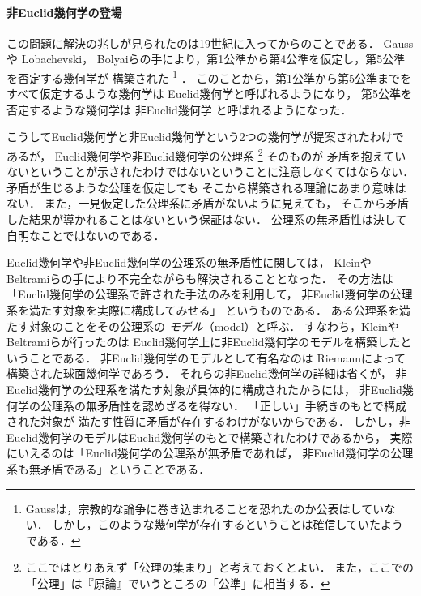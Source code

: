  \paragraph{非Euclid幾何学の登場}
  この問題に解決の兆しが見られたのは19世紀に入ってからのことである．
  Gaussや
  Lobachevski，
  Bolyaiらの手により，第1公準から第4公準を仮定し，第5公準を否定する幾何学が
  構築された
  \footnote{Gaussは，宗教的な論争に巻き込まれることを恐れたのか公表はしていない．
  しかし，このような幾何学が存在するということは確信していたようである．}
  ．
  このことから，第1公準から第5公準までを
  すべて仮定するような幾何学は
  Euclid幾何学と呼ばれるようになり，
  第5公準を否定するような幾何学は
  非Euclid幾何学
  と呼ばれるようになった．

  こうしてEuclid幾何学と非Euclid幾何学という2つの幾何学が提案されたわけであるが，
  Euclid幾何学や非Euclid幾何学の公理系
  \footnote{ここではとりあえず「公理の集まり」と考えておくとよい．
  また，ここでの「公理」は『原論』でいうところの「公準」に相当する．}
  そのものが
  矛盾を抱えていないということが示されたわけではないということに注意しなくてはならない．
  矛盾が生じるような公理を仮定しても
  そこから構築される理論にあまり意味はない．
  また，一見仮定した公理系に矛盾がないように見えても，
  そこから矛盾した結果が導かれることはないという保証はない．
  公理系の無矛盾性は決して自明なことではないのである．

  Euclid幾何学や非Euclid幾何学の公理系の無矛盾性に関しては，
  Kleinや
  Beltramiらの手により不完全ながらも解決されることとなった．
  その方法は「Euclid幾何学の公理系で許された手法のみを利用して，
  非Euclid幾何学の公理系を満たす対象を実際に構成してみせる」
  というものである．
  ある公理系を満たす対象のことをその公理系の
  \emph{モデル}（model）と呼ぶ．
  すなわち，KleinやBeltramiらが行ったのは
  Euclid幾何学上に非Euclid幾何学のモデルを構築したということである．
  非Euclid幾何学のモデルとして有名なのは
  Riemannによって構築された球面幾何学であろう．
  それらの非Euclid幾何学の詳細は省くが，
  非Euclid幾何学の公理系を満たす対象が具体的に構成されたからには，
  非Euclid幾何学の公理系の無矛盾性を認めざるを得ない．
  「正しい」手続きのもとで構成された対象が
  満たす性質に矛盾が存在するわけがないからである．
  しかし，非Euclid幾何学のモデルはEuclid幾何学のもとで構築されたわけであるから，
  実際にいえるのは「Euclid幾何学の公理系が無矛盾であれば，
  非Euclid幾何学の公理系も無矛盾である」ということである．

